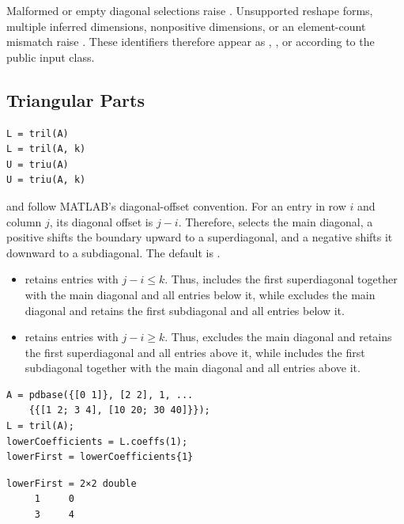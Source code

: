 \remarkshead
Malformed or empty diagonal selections raise . Unsupported reshape forms, multiple inferred dimensions, nonpositive dimensions, or an element-count mismatch raise . These identifiers therefore appear as , , or  according to the public input class.

\subsection{Triangular Parts}
\label{sec:pdbase-matrix-triangular}

\syntaxhead
\begin{lstlisting}[style=dpsyntax]
L = tril(A)
L = tril(A, k)
U = triu(A)
U = triu(A, k)
\end{lstlisting}

\descriptionhead
{} and  follow MATLAB's diagonal-offset convention. For an entry in row $i$ and column $j$, its diagonal offset is $j-i$. Therefore,  selects the main diagonal, a positive  shifts the boundary upward to a superdiagonal, and a negative  shifts it downward to a subdiagonal. The default is .
\begin{itemize}[leftmargin=*]
    \item {} retains entries with $j-i\leq k$. Thus,  includes the first superdiagonal together with the main diagonal and all entries below it, while  excludes the main diagonal and retains the first subdiagonal and all entries below it.
    \item {} retains entries with $j-i\geq k$. Thus,  excludes the main diagonal and retains the first superdiagonal and all entries above it, while  includes the first subdiagonal together with the main diagonal and all entries above it.
\end{itemize}

\examplehead
\begin{lstlisting}[style=dpmatlab]
A = pdbase({[0 1]}, [2 2], 1, ...
    {{[1 2; 3 4], [10 20; 30 40]}});
L = tril(A);
lowerCoefficients = L.coeffs(1);
lowerFirst = lowerCoefficients{1}
\end{lstlisting}
\begin{lstlisting}[style=dpoutput]
lowerFirst = 2×2 double
     1     0
     3     4
\end{lstlisting}

